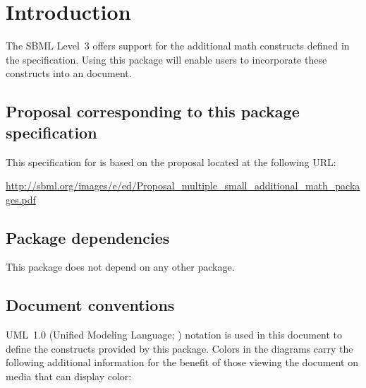 
\section{Introduction}
\label{intro}

The SBML Level~3 \ThisPackage offers support for the additional math constructs defined in the \sbmlthreecorev specification. Using this package will enable users to incorporate these constructs into an \sbmlthreecore document.



\subsection{Proposal corresponding to this package specification}

This specification for \sbmlthreepkg is based on the proposal located at the following URL:

\begin{center}
  \vspace*{1ex}\small
  \url{http://sbml.org/images/e/ed/Proposal_multiple_small_additional_math_packages.pdf}
  \vspace*{1ex}
\end{center}


\subsection{Package dependencies}

This package does not depend on any other package.


\subsection{Document conventions}
\label{conventions}

UML~1.0 (Unified Modeling Language; \citealt{eriksson:1998, oestereich:1999}) notation is used in this document to define the constructs provided by this package.  Colors in the diagrams carry the following additional information for the benefit of those viewing the document on media that can display color:

